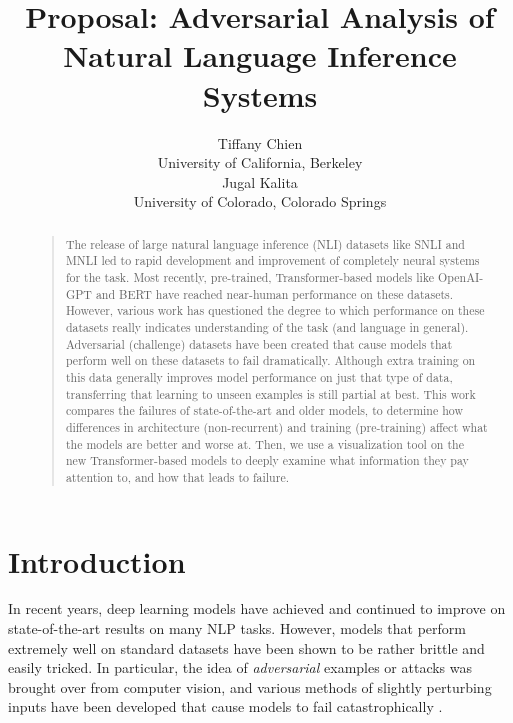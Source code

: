 \documentclass[letterpaper]{article}
\begin{document}
%
\title{Proposal: Adversarial Analysis of Natural Language Inference Systems}
\author{Tiffany Chien \\
University of California, Berkeley\\
\And
Jugal Kalita \\
University of Colorado, Colorado Springs
}
\maketitle
\begin{abstract}
\begin{quote}
The release of large natural language inference (NLI) datasets like SNLI and MNLI led to rapid development and improvement of completely neural systems for the task.
Most recently, pre-trained, Transformer-based models like OpenAI-GPT and BERT have reached near-human performance on these datasets.
However, various work has questioned the degree to which performance on these datasets really indicates understanding of the task (and language in general).
Adversarial (challenge) datasets have been created that cause models that perform well on these datasets to fail dramatically.
Although extra training on this data generally improves model performance on just that type of data, transferring that learning to unseen examples is still partial at best.
This work compares the failures of state-of-the-art and older models, to determine how differences in architecture (non-recurrent) and training (pre-training) affect what the models are better and worse at.
Then, we use a visualization tool on the new Transformer-based models to deeply examine what information they pay attention to, and how that leads to failure.
\end{quote}
\end{abstract}

\section{Introduction}
In recent years, deep learning models have achieved and continued to improve on state-of-the-art results on many NLP tasks.
However, models that perform extremely well on standard datasets have been shown to be rather brittle and easily tricked.
In particular, the idea of \emph{adversarial} examples or attacks was brought over from computer vision, and various methods of slightly perturbing inputs have been developed that cause models to fail catastrophically \cite{mccoy_right_2019,glockner_breaking_2018,naik_stress_2018}.
\end{document}
